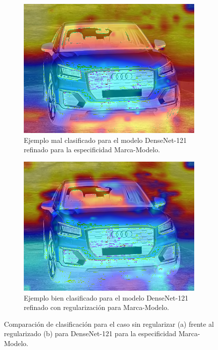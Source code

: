 \begin{figure}[H]
	\centering
	\begin{subfigure}
		{.45\textwidth}
		\centering
		\includegraphics[width=\linewidth]{img/220_false.png}
		\caption{Ejemplo mal clasificado para el modelo DenseNet-121 refinado para
			la especificidad Marca-Modelo.}
		\label{fig:ex-densenet-refine-1}
	\end{subfigure}%
	\qquad
	\begin{subfigure}
		{.45\textwidth}
		\centering
		\includegraphics[width=\linewidth]{img/220_true.png}
		\caption{Ejemplo bien clasificado para el modelo DenseNet-121 refinado con
			regularización para Marca-Modelo.}
		\label{fig:ex-densenet-refine-2}
	\end{subfigure}
	\caption{Comparación de clasificación para el caso sin regularizar (a) frente
		al regularizado (b) para DenseNet-121 para la especificidad Marca-Modelo.}
	\label{fig:ex-densenet-refine}
\end{figure}

